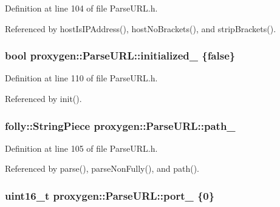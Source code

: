 Definition at line 104 of file Parse\+U\+R\+L.\+h.



Referenced by host\+Is\+I\+P\+Address(), host\+No\+Brackets(), and strip\+Brackets().

\subsubsection[{initialized\+\_\+}]{\setlength{\rightskip}{0pt plus 5cm}bool proxygen\+::\+Parse\+U\+R\+L\+::initialized\+\_\+ \{false\}\hspace{0.3cm}{\ttfamily [private]}}\label{classproxygen_1_1ParseURL_a440a134c2b959e5629c95e0f8037626a}


Definition at line 110 of file Parse\+U\+R\+L.\+h.



Referenced by init().

\subsubsection[{path\+\_\+}]{\setlength{\rightskip}{0pt plus 5cm}folly\+::\+String\+Piece proxygen\+::\+Parse\+U\+R\+L\+::path\+\_\+\hspace{0.3cm}{\ttfamily [private]}}\label{classproxygen_1_1ParseURL_a6f73dfe733a0860842ea2bfce1656a21}


Definition at line 105 of file Parse\+U\+R\+L.\+h.



Referenced by parse(), parse\+Non\+Fully(), and path().

\subsubsection[{port\+\_\+}]{\setlength{\rightskip}{0pt plus 5cm}uint16\+\_\+t proxygen\+::\+Parse\+U\+R\+L\+::port\+\_\+ \{0\}\hspace{0.3cm}{\ttfamily [private]}}\label{classproxygen_1_1ParseURL_af70c23d56ebd22eda0455b229673c705}


